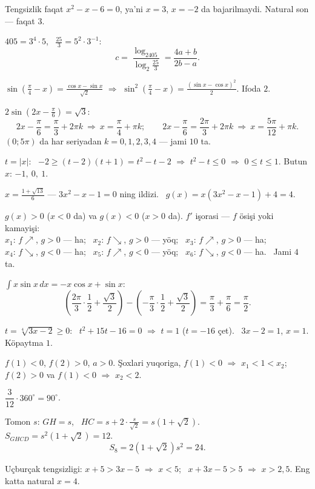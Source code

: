 Tengsizlik faqat $x^2-x-6=0$, ya'ni $x=3$, $x=-2$ da bajarilmaydi. Natural son — faqat $3$.

$405=3^4\cdot5$, \ $\frac{25}3=5^2\cdot3^{-1}$:
\[c=\frac{\log_2405}{\log_2\frac{25}3}=\frac{4a+b}{2b-a}.\]

$\sin\left(\frac\pi4-x\right)=\frac{\cos x-\sin x}{\sqrt2}$ $\Rightarrow$ $\sin^2\left(\frac\pi4-x\right)=\frac{(\sin x-\cos x)^2}2$. Ifoda $2$.

$2\sin\left(2x-\frac\pi6\right)=\sqrt3$:
\[2x-\frac\pi6=\frac\pi3+2\pi k\ \Rightarrow\ x=\frac\pi4+\pi k;\qquad 2x-\frac\pi6=\frac{2\pi}3+2\pi k\ \Rightarrow\ x=\frac{5\pi}{12}+\pi k.\]
$(0;5\pi)$ da har seriyadan $k=0,1,2,3,4$ — jami $10$ ta.

$t=|x|$: \ $-2\ge(t-2)(t+1)=t^2-t-2$ $\Rightarrow$ $t^2-t\le0$ $\Rightarrow$ $0\le t\le1$. Butun $x$: $-1,\ 0,\ 1$.

$x=\frac{1+\sqrt{13}}6$ — $3x^2-x-1=0$ ning ildizi. \ $g(x)=x\left(3x^2-x-1\right)+4=4$.

$g(x)>0$ ($x<0$ da) va $g(x)<0$ ($x>0$ da). $f'$ işorasi — $f$ ösişi yoki kamayişi:\\
$x_1$: $f\nearrow$, $g>0$ — ha; \ $x_2$: $f\searrow$, $g>0$ — yöq; \ $x_3$: $f\nearrow$, $g>0$ — ha;\\
$x_4$: $f\searrow$, $g<0$ — ha; \ $x_5$: $f\nearrow$, $g<0$ — yöq; \ $x_6$: $f\searrow$, $g<0$ — ha. \ Jami $4$ ta.

$\int x\sin x\,dx=-x\cos x+\sin x$:
\[\left(\frac{2\pi}3\cdot\frac12+\frac{\sqrt3}2\right)-\left(-\frac\pi3\cdot\frac12+\frac{\sqrt3}2\right)=\frac\pi3+\frac\pi6=\frac\pi2.\]

$t=\sqrt[4]{3x-2}\ge0$: \ $t^2+15t-16=0$ $\Rightarrow$ $t=1$ ($t=-16$ çet). \ $3x-2=1$, $x=1$. Köpaytma $1$.

$f(1)<0$, $f(2)>0$, $a>0$. Şoxlari yuqoriga, $f(1)<0$ $\Rightarrow$ $x_1<1<x_2$; $f(2)>0$ va $f(1)<0$ $\Rightarrow$ $x_2<2$.

$\dfrac3{12}\cdot360^\circ=90^\circ$.

Tomon $s$: $GH=s$, \ $HC=s+2\cdot\frac s{\sqrt2}=s\left(1+\sqrt2\right)$. \ $S_{GHCD}=s^2\left(1+\sqrt2\right)=12$.
\[S_8=2\left(1+\sqrt2\right)s^2=24.\]

Uçburçak tengsizligi: $x+5>3x-5$ $\Rightarrow$ $x<5$; \ $x+3x-5>5$ $\Rightarrow$ $x>2{,}5$. Eng katta natural $x=4$.

